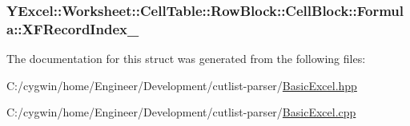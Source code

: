 \subsubsection[{X\+F\+Record\+Index\+\_\+}]{ Y\+Excel\+::\+Worksheet\+::\+Cell\+Table\+::\+Row\+Block\+::\+Cell\+Block\+::\+Formula\+::\+X\+F\+Record\+Index\+\_\+}\label{struct_y_excel_1_1_worksheet_1_1_cell_table_1_1_row_block_1_1_cell_block_1_1_formula_a4d4ac944327a7abe1e7b53f243d57511}


The documentation for this struct was generated from the following files\+:\begin{DoxyCompactItemize}
\item 
C\+:/cygwin/home/\+Engineer/\+Development/cutlist-\/parser/\hyperlink{_basic_excel_8hpp}{Basic\+Excel.\+hpp}\item 
C\+:/cygwin/home/\+Engineer/\+Development/cutlist-\/parser/\hyperlink{_basic_excel_8cpp}{Basic\+Excel.\+cpp}\end{DoxyCompactItemize}
